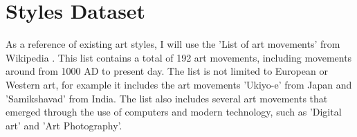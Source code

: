 

\section{Styles Dataset}
\label{cha:Styles Dataset}

As a reference of existing art styles, I will use the 'List of art movements' from Wikipedia \autocite{wikipedia-styles}. This list contains a total of 192 art movements, including movements around from 1000 AD to present day. The list is not limited to European or Western art, for example it includes the art movements 'Ukiyo-e' from Japan and 'Samikshavad' from India. The list also includes several art movements that emerged through the use of computers and modern technology, such as 'Digital art' and 'Art Photography'.





